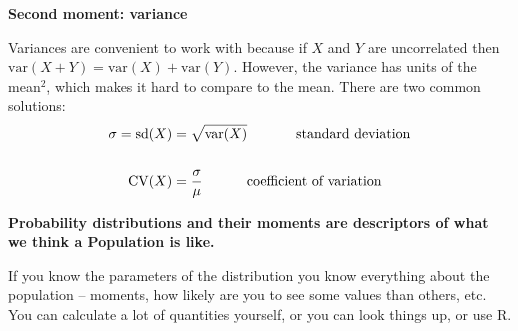 \documentclass[12pt,xcolor=svgnames]{beamer}
\newcommand{\rd}{\color{red}}
\newcommand{\bl}{\color{blue}}
\newcommand{\theme}{\color{FireBrick}}
\newcommand{\mr}[1]{\mathrm{#1}}
\newcommand{\ds}[1]{\mathds{#1}}
\newcommand{\sk}{\vspace{.4cm}}
\newcommand{\nochap}{\vspace{0.5cm}}
\newcommand{\nsk}{\vspace{-.4cm}}
\newcommand{\chap}[1]{{\theme \Large \bf #1} \sk}
\newcommand{\E}{\ds{E}}
\newcommand{\var}{\text{var}}
\begin{document}
\begin{frame}
\chap{Second moment: variance}

Variances are convenient to work with because if $X$ and $Y$ are uncorrelated then $\var(X+Y)=\var(X)+\var(Y)$. However, the variance has units of the mean$^2$, which makes it hard to compare to the mean. There are two common solutions:
\begin{align*}
\sigma = \mr{sd}(X) & = \sqrt{\var(X)}  \text{ \hspace{1cm} standard deviation} \\
& \\
\mr{CV}(X) & = \frac{\sigma}{\mu} \text{\hspace{1cm} coefficient of variation}
\end{align*}

\end{frame}

\begin{frame}
\nochap

{\bf Probability distributions and their moments are descriptors of what we think a {\rd Population} is like.}

\sk
If you know the parameters of the distribution you know everything about the population -- moments, how likely are you to see some values than others, etc. You can calculate a lot of quantities yourself, or you can look things up, or use {\sf R}. 

\end{frame}

\end{document}
